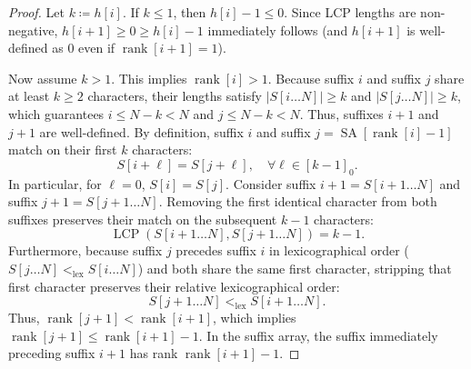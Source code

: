 \documentclass[11pt, letterpaper]{article}
\begin{document}
\begin{proof}
Let $k \coloneqq h[i]$. If $k \le 1$, then $h[i] - 1 \le 0$. Since LCP lengths are non-negative, $h[i+1] \ge 0 \ge h[i] - 1$ immediately follows (and $h[i+1]$ is well-defined as $0$ even if $\operatorname{rank}[i+1] = 1$).

Now assume $k > 1$. This implies $\operatorname{rank}[i] > 1$. Because suffix $i$ and suffix $j$ share at least $k \ge 2$ characters, their lengths satisfy $|S[i \dots N]| \ge k$ and $|S[j \dots N]| \ge k$, which guarantees $i \le N - k < N$ and $j \le N - k < N$. Thus, suffixes $i+1$ and $j+1$ are well-defined.
By definition, suffix $i$ and suffix $j = \operatorname{SA}[\operatorname{rank}[i] - 1]$ match on their first $k$ characters:
\begin{equation}
    S[i + \ell] = S[j + \ell], \quad \forall \ell \in [k-1]_0.
\end{equation}
In particular, for $\ell = 0$, $S[i] = S[j]$. 
Consider suffix $i+1 = S[i+1 \dots N]$ and suffix $j+1 = S[j+1 \dots N]$. 
Removing the first identical character from both suffixes preserves their match on the subsequent $k - 1$ characters:
\begin{equation}
    \operatorname{LCP}(S[i+1 \dots N], S[j+1 \dots N]) = k - 1.
\end{equation}
Furthermore, because suffix $j$ precedes suffix $i$ in lexicographical order ($S[j \dots N] <_{\text{lex}} S[i \dots N]$) and both share the same first character, stripping that first character preserves their relative lexicographical order:
\begin{equation}
    S[j+1 \dots N] <_{\text{lex}} S[i+1 \dots N].
\end{equation}
Thus, $\operatorname{rank}[j+1] < \operatorname{rank}[i+1]$, which implies $\operatorname{rank}[j+1] \le \operatorname{rank}[i+1] - 1$. 
In the suffix array, the suffix immediately preceding suffix $i+1$ has rank $\operatorname{rank}[i+1] - 1$. 
 

\end{proof}
\end{document}
